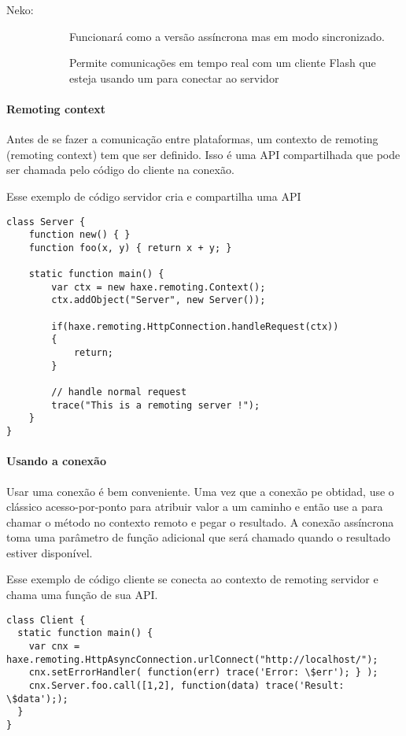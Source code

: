 {\begin{description}
	\item[Neko:]
		\begin{description}
			\item[]  
                Funcionará como a versão assíncrona mas em modo sincronizado.
			\item[]  
                Permite comunicações em tempo real com um cliente Flash que esteja usando um  para conectar ao servidor
		\end{description}
\end{description}

\paragraph{Remoting context}

Antes de se fazer a comunicação entre plataformas, um contexto de remoting (remoting context) tem que ser definido. Isso é uma API compartilhada que pode ser chamada pelo código do cliente na conexão.

Esse exemplo de código servidor cria e compartilha uma API

\begin{lstlisting}
class Server {
	function new() { }
	function foo(x, y) { return x + y; }

	static function main() {
		var ctx = new haxe.remoting.Context();
		ctx.addObject("Server", new Server());
		
		if(haxe.remoting.HttpConnection.handleRequest(ctx))
		{
			return;
		}
		
		// handle normal request
		trace("This is a remoting server !");
	} 
}
\end{lstlisting}

\paragraph{Usando a conexão}

Usar uma conexão é bem conveniente. Uma vez que a conexão pe obtidad, use o clássico acesso-por-ponto para atribuir valor a um caminho e então use a  para chamar o método no contexto remoto e pegar o resultado.
A conexão assíncrona toma uma parâmetro de função adicional que será chamado quando o resultado estiver disponível.

Esse exemplo de código cliente se conecta ao contexto de remoting servidor e chama uma função  de sua API.
\begin{lstlisting}
class Client {
  static function main() {
    var cnx = haxe.remoting.HttpAsyncConnection.urlConnect("http://localhost/");
    cnx.setErrorHandler( function(err) trace('Error: \$err'); } );
    cnx.Server.foo.call([1,2], function(data) trace('Result: \$data'););
  }
}
\end{lstlisting}

}
